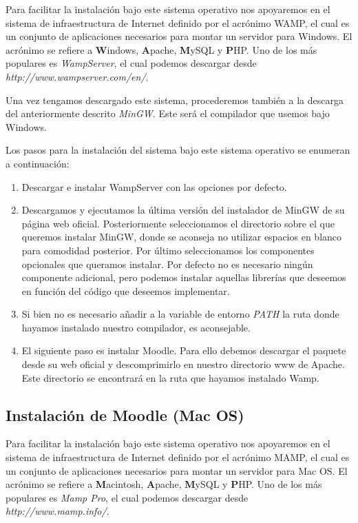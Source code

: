 Para facilitar la instalación bajo este sistema operativo nos apoyaremos en el sistema de infraestructura de Internet definido por el acrónimo WAMP, el cual es un conjunto de aplicaciones necesarios para montar un servidor para Windows. El acrónimo se refiere a \textbf{W}indows, \textbf{A}pache, \textbf{M}ySQL y \textbf{P}HP. Uno de los más populares es \emph{WampServer}, el cual podemos descargar desde \emph{http://www.wampserver.com/en/}.

Una vez tengamos descargado este sistema, procederemos también a la descarga del anteriormente descrito \emph{MinGW}. Este será el compilador que usemos bajo Windows.

Los pasos para la instalación del sistema bajo este sistema operativo se enumeran a continuación:

\begin{enumerate}
	\item Descargar e instalar WampServer con las opciones por defecto.
	\item Descargamos y ejecutamos la última versión del instalador de MinGW de su página web oficial. Posteriormente seleccionamos el directorio sobre el que queremos instalar MinGW, donde se aconseja no utilizar espacios en blanco para comodidad posterior. Por último seleccionamos los componentes opcionales que queramos instalar. Por defecto no es necesario ningún componente adicional, pero podemos instalar aquellas librerías que deseemos en función del código que deseemos implementar.
	\item Si bien no es necesario añadir a la variable de entorno \emph{PATH} la ruta donde hayamos instalado nuestro compilador, es aconsejable.
	\item El siguiente paso es instalar Moodle. Para ello debemos descargar el paquete desde su web oficial y descomprimirlo en nuestro directorio www de Apache. Este directorio se encontrará en la ruta que hayamos instalado Wamp.
\end{enumerate}

\subsection{Instalación de Moodle (Mac OS)}

Para facilitar la instalación bajo este sistema operativo nos apoyaremos en el sistema de infraestructura de Internet definido por el acrónimo MAMP, el cual es un conjunto de aplicaciones necesarios para montar un servidor para Mac OS. El acrónimo se refiere a \textbf{M}acintosh, \textbf{A}pache, \textbf{M}ySQL y \textbf{P}HP. Uno de los más populares es \emph{Mamp Pro}, el cual podemos descargar desde \emph{http://www.mamp.info/}.


